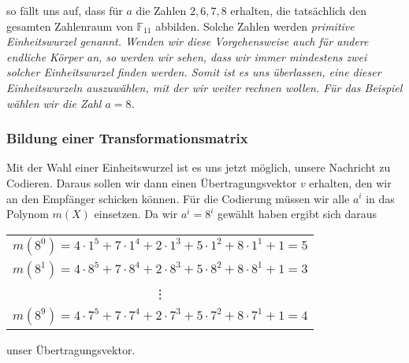 so fällt uns auf, dass für $a$ die Zahlen $2,6,7,8$ erhalten, die tatsächlich den gesamten Zahlenraum von $\mathbb{F}_{11}$ abbilden. Solche Zahlen werden \em primitive Einheitswurzel \em genannt. 
Wenden wir diese Vorgehensweise auch für andere endliche Körper an, so werden wir sehen, dass wir immer mindestens zwei solcher Einheitswurzel finden werden. Somit ist es uns überlassen, eine dieser Einheitswurzeln auszuwählen, mit der wir weiter rechnen wollen. Für das Beispiel wählen wir die Zahl $a = 8$.

\subsubsection{Bildung einer Transformationsmatrix
	\label{reedsolomon:subsection:transMat}}

Mit der Wahl einer Einheitswurzel ist es uns jetzt möglich, unsere Nachricht zu Codieren. Daraus sollen wir dann einen Übertragungsvektor $v$ erhalten, den wir an den Empfänger schicken können. Für die Codierung müssen wir alle $a^i$ in das Polynom $m(X)$ einsetzen. Da wir $a^i = 8^i$ gewählt haben  ergibt sich daraus 
%
%
\begin{center}
	\begin{tabular}{c}
		$m(8^0) = 4 \cdot 1^5 + 7 \cdot 1^4 + 2 \cdot 1^3 + 5 \cdot 1^2 + 8 \cdot 1^1 + 1 = 5$ \\
		$m(8^1) = 4 \cdot 8^5 + 7 \cdot 8^4 + 2 \cdot 8^3 + 5 \cdot 8^2 + 8 \cdot 8^1 + 1 = 3$ \\
		\vdots \\
		$m(8^9) = 4 \cdot 7^5 + 7 \cdot 7^4 + 2 \cdot 7^3 + 5 \cdot 7^2 + 8 \cdot 7^1 + 1 = 4$
	\end{tabular}
\end{center}
unser Übertragungsvektor. 

